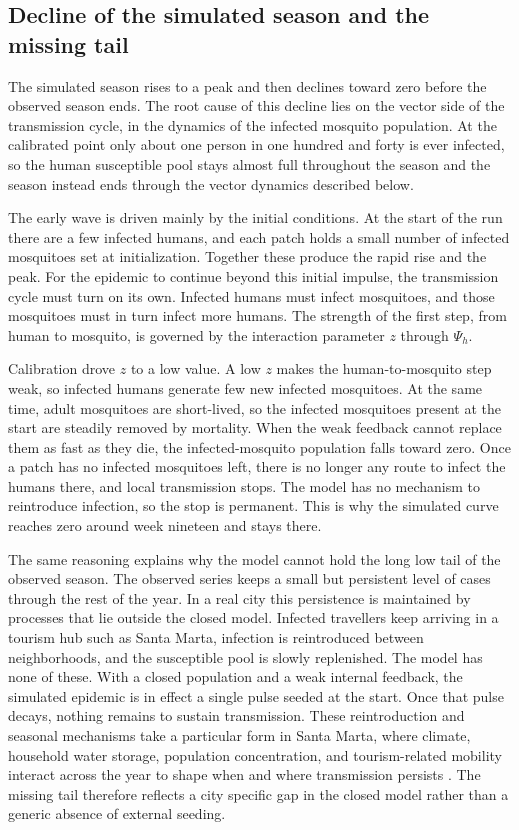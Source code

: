 \documentclass[applsci,article,accept,pdftex,moreauthors]{Definitions/mdpi}
\begin{document}
\subsection{Decline of the simulated season and the missing tail}

The simulated season rises to a peak and then declines toward zero before the observed season ends. The root cause of this decline lies on the vector side of the transmission cycle, in the dynamics of the infected mosquito population. At the calibrated point only about one person in one hundred and forty is ever infected, so the human susceptible pool stays almost full throughout the season and the season instead ends through the vector dynamics described below.

The early wave is driven mainly by the initial conditions. At the start of the run there are a few infected humans, and each patch holds a small number of infected mosquitoes set at initialization. Together these produce the rapid rise and the peak. For the epidemic to continue beyond this initial impulse, the transmission cycle must turn on its own. Infected humans must infect mosquitoes, and those mosquitoes must in turn infect more humans. The strength of the first step, from human to mosquito, is governed by the interaction parameter $z$ through $\Psi_h$.

Calibration drove $z$ to a low value. A low $z$ makes the human-to-mosquito step weak, so infected humans generate few new infected mosquitoes. At the same time, adult mosquitoes are short-lived, so the infected mosquitoes present at the start are steadily removed by mortality. When the weak feedback cannot replace them as fast as they die, the infected-mosquito population falls toward zero. Once a patch has no infected mosquitoes left, there is no longer any route to infect the humans there, and local transmission stops. The model has no mechanism to reintroduce infection, so the stop is permanent. This is why the simulated curve reaches zero around week nineteen and stays there.

The same reasoning explains why the model cannot hold the long low tail of the observed season. The observed series keeps a small but persistent level of cases through the rest of the year. In a real city this persistence is maintained by processes that lie outside the closed model. Infected travellers keep arriving in a tourism hub such as Santa Marta, infection is reintroduced between neighborhoods, and the susceptible pool is slowly replenished. The model has none of these. With a closed population and a weak internal feedback, the simulated epidemic is in effect a single pulse seeded at the start. Once that pulse decays, nothing remains to sustain transmission. These reintroduction and seasonal mechanisms take a particular form in Santa Marta, where climate, household water storage, population concentration, and tourism-related mobility interact across the year to shape when and where transmission persists \cite{MARTIN2026100164}. The missing tail therefore reflects a city specific gap in the closed model rather than a generic absence of external seeding.
\end{document}
